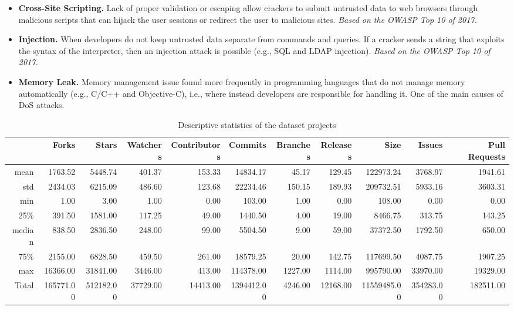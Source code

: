 \documentclass[10pt,conference]{IEEEtran}
\begin{document}
\begin{itemize}
	\item \textbf{Cross-Site Scripting.} Lack of proper validation or escaping
	allow crackers to submit untrusted data to web browsers through malicious
	scripts that can hijack the user sessions or redirect the user to malicious
	sites. \textit{Based on the OWASP Top 10 of 2017.}

	\item \textbf{Injection.} When developers do not keep untrusted data separate
	from commands and queries. If a cracker sends a string that exploits the
	syntax of the interpreter, then an injection attack is possible (e.g., SQL and
	LDAP injection). \textit{Based on the OWASP Top 10 of 2017.}

	\item \textbf{Memory Leak.} Memory management issue found more frequently in
	programming languages that do not manage memory automatically (e.g., C/C++ and
	Objective-C), i.e., where instead developers are responsible for handling it.
	One of the main causes of DoS attacks.
\end{itemize}

\begin{table}[h]
	\centering
	\caption{Descriptive statistics of the dataset projects}
\begin{tabular}{@{}rrrrrrrrrrr@{}}
\toprule
      & Forks   & Stars   & Watchers & Contributors & Commits  & Branches & Releases & Size      & Issues & Pull Requests  \\ \midrule
mean  & 1763.52 & 5448.74 & 401.37   & 153.33       & 14834.17 & 45.17    & 129.45   & 122973.24 & 3768.97   & 1941.61 \\
std   & 2434.03 & 6215.09 & 486.60   & 123.68       & 22234.46 & 150.15   & 189.93   & 209732.51 & 5933.16   & 3603.31 \\
min   & 1.00       & 3.00       & 1.00        & 0.00            & 103.00      & 1.00        & 0.00        & 108.00       & 0.00         & 0.00       \\
25\%  & 391.50  & 1581.00    & 117.25   & 49.00           & 1440.50  & 4.00        & 19.00       & 8466.75   & 313.75    & 143.25  \\
median  & 838.50  & 2836.50 & 248.00      & 99.00           & 5504.50  & 9.00        & 59.00       & 37372.50  & 1792.50   & 650.00     \\
75\%  & 2155.00    & 6828.50 & 459.50   & 261.00          & 18579.25 & 20.00       & 142.75   & 117699.50 & 4087.75   & 1907.25 \\
max   & 16366.00   & 31841.00   & 3446.00     & 413.00          & 114378.00   & 1227.00     & 1114.00     & 995790.00    & 33970.00     & 19329.00   \\
Total & 165771.00  & 512182.00  & 37729.00    & 14413.00        & 1394412.00  & 4246.00     & 12168.00    & 11559485.00  & 354283.00    & 182511.00  \\ \bottomrule
\end{tabular}
\label{tab:dataset}
\end{table}
\end{document}
